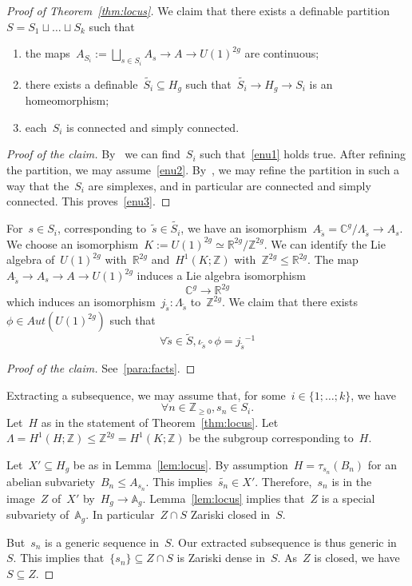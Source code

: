 \documentclass[12pt]{amsart}
\newcommand{\R}{{\mathbb R}}
\newcommand{\Z}{{\mathbb Z}}
\newcommand{\C}{{\mathbb C}}
\newcommand{\wt}[1]{{\widetilde{#1}}}
\begin{document}
\begin{proof}[Proof of Theorem~\ref{thm:locus}]
We claim that there exists a definable partition~$S=S_1\sqcup\ldots\sqcup S_k$ such that
\begin{enumerate}
\item \label{enu1} the maps~$A_{S_i}:=\bigsqcup_{s\in S_i} A_s\to A\to U(1)^{2g}$ are continuous;
\item \label{enu2} there exists a definable~$\wt{S_i}\subseteq H_g$ such that~$\wt{S_i}\to H_g\to S_i$ is an homeomorphism;
\item \label{enu3} each~$S_i$ is connected and simply connected.
\end{enumerate}
\begin{proof}[Proof of the claim] By~\cite[Ch. 9]{VdD} we can find~$S_i$ such that~\eqref{enu1} holds true. After refining the partition, we may assume~\eqref{enu2}. By~\cite[Ch. 8]{VdD}, we may refine the partition in such a way that the~$S_i$ are simplexes, and in particular are connected and simply connected. This proves~\eqref{enu3}. 
\end{proof}
For~$s\in S_i$, corresponding to~$\wt{s}\in \wt{S_i}$, we have an isomorphism~$A_{\wt{s}}=\C^g/\Lambda_{\wt{s}}\to A_s$.
We choose an isomorphism~$K:=U(1)^{2g}\simeq \R^{2g}/\Z^{2g}$. We can identify the Lie algebra of~$U(1)^{2g}$ with~$\R^{2g}$ and~$H^1(K;\Z)$ with~$\Z^{2g}\leq\R^{2g}$. The map~$A_{\wt{s}}\to A_s\to A\to U(1)^{2g}$ induces a Lie algebra isomorphism
\[
\C^g\to \R^{2g}
\]
which induces an isomorphism~$j_{\wt{s}}:\Lambda_\wt{s}$ to~$\Z^{2g}$. We claim that there exists~$\phi\in Aut(U(1)^{2g})$ such that
\[
\forall \wt{s}\in \wt{S}, \iota_\wt{s}\circ\phi={j_{\wt{s}}}^{-1}
\]
\begin{proof}[Proof of the claim] See~\ref{para:facts}.
\end{proof}
Extracting a subsequence, we may assume that, for some~$i\in \{1;\ldots;k\}$, we have
\[
\forall n\in\Z_{\geq0}, s_n\in S_i.
\]
Let~$H$ as in the statement of Theorem~\ref{thm:locus}.
Let~$\Lambda=H^1(H;\Z)\leq \Z^{2g}=H^1(K;\Z)$ be the subgroup corresponding to~$H$.

Let~$X'\subseteq H_g$ be as in Lemma~\ref{lem:locus}. By assumption~$H=\tau_{s_n}(B_n)$ for an abelian 
subvariety~$B_n\leq A_{s_n}$. This implies~$\wt{s_n}\in X'$. Therefore,~$s_n$ is in the image~$Z$ of~$X'$ by~$H_g\to \mathbb{A}_g$. Lemma~\ref{lem:locus} implies that~$Z$ is a special subvariety of~$\mathbb{A}_g$. In particular~$Z\cap S$ Zariski closed in~$S$.

But~$s_n$ is a generic sequence in~$S$. Our extracted subsequence is thus generic in~$S$. This implies that~$\{s_n\}\subseteq  Z\cap S$ is Zariski dense in~$S$. As~$Z$ is closed, we have~$S\subseteq Z$.


\end{proof}
\end{document}
